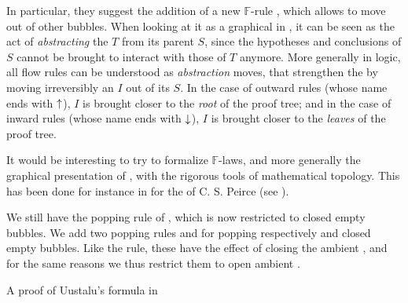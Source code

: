 \begin{description}
  In particular, they suggest the addition of a new $\mathbb{F}$-rule
  , which allows to move   out of other 
  bubbles. When looking at it as a graphical  in
  , it can be seen as the act of \emph{abstracting} the
   $T$ from its parent  $S$, since the hypotheses and conclusions
  of $S$ cannot be brought to interact with those of $T$ anymore. More generally
  in  logic, all flow rules can be understood as
  \emph{abstraction} moves, that strengthen the  by moving irreversibly an
   $I$ out of its  $S$. In the case of outward rules (whose name ends
  with $\uparrow$), $I$ is brought closer to the \emph{root} of the proof tree;
  and in the case of inward rules (whose name ends with $\downarrow$), $I$ is
  brought closer to the \emph{leaves} of the proof tree.
  
  It would be interesting to try to formalize $\mathbb{F}$-laws, and more
  generally the graphical presentation of , with the rigorous
  tools of mathematical topology. This has been done for instance in
   for the  of C. S.
  Peirce (see ).

  \item[\textbf{\membrane}] 
  We still have the popping rule  of , which is now restricted to
  closed empty bubbles. We add two popping rules  and  for
  popping respectively  and  closed empty bubbles. Like the
   rule, these have the effect of closing the ambient
  , and for the same reasons we thus restrict them to open ambient
  .

  \begin{marginfigure}
    
    \caption{A proof of Uustalu's formula in }
  \end{marginfigure}


\end{description}
